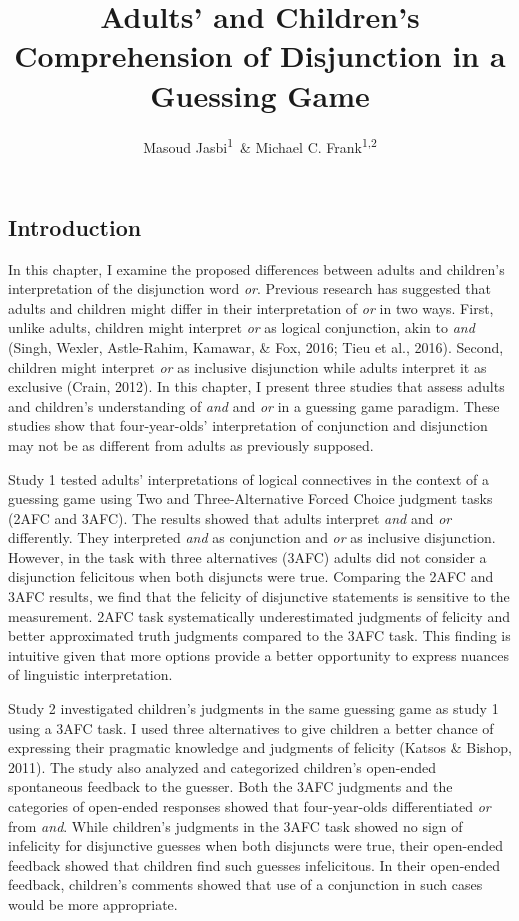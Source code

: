 \documentclass[man]{apa6}
\title{Adults' and Children's Comprehension of Disjunction in a Guessing Game}
\author{Masoud Jasbi\textsuperscript{1}~\& Michael C. Frank\textsuperscript{1,2}}
\affiliation{
    \vspace{0.5cm}
          \textsuperscript{1} Harvard University\\
          \textsuperscript{2} Stanford University  }
\theoremstyle{definition}
\theoremstyle{definition}
\theoremstyle{definition}
\theoremstyle{remark}
\begin{document}
\maketitle

\setcounter{secnumdepth}{0}



\subsection{Introduction}\label{introduction}

In this chapter, I examine the proposed differences between adults and
children's interpretation of the disjunction word \emph{or}. Previous
research has suggested that adults and children might differ in their
interpretation of \emph{or} in two ways. First, unlike adults, children
might interpret \emph{or} as logical conjunction, akin to \emph{and}
(Singh, Wexler, Astle-Rahim, Kamawar, \& Fox, 2016; Tieu et al., 2016).
Second, children might interpret \emph{or} as inclusive disjunction
while adults interpret it as exclusive (Crain, 2012). In this chapter, I
present three studies that assess adults and children's understanding of
\emph{and} and \emph{or} in a guessing game paradigm. These studies show
that four-year-olds' interpretation of conjunction and disjunction may
not be as different from adults as previously supposed.

Study 1 tested adults' interpretations of logical connectives in the
context of a guessing game using Two and Three-Alternative Forced Choice
judgment tasks (2AFC and 3AFC). The results showed that adults interpret
\emph{and} and \emph{or} differently. They interpreted \emph{and} as
conjunction and \emph{or} as inclusive disjunction. However, in the task
with three alternatives (3AFC) adults did not consider a disjunction
felicitous when both disjuncts were true. Comparing the 2AFC and 3AFC
results, we find that the felicity of disjunctive statements is
sensitive to the measurement. 2AFC task systematically underestimated
judgments of felicity and better approximated truth judgments compared
to the 3AFC task. This finding is intuitive given that more options
provide a better opportunity to express nuances of linguistic
interpretation.

Study 2 investigated children's judgments in the same guessing game as
study 1 using a 3AFC task. I used three alternatives to give children a
better chance of expressing their pragmatic knowledge and judgments of
felicity (Katsos \& Bishop, 2011). The study also analyzed and
categorized children's open-ended spontaneous feedback to the guesser.
Both the 3AFC judgments and the categories of open-ended responses
showed that four-year-olds differentiated \emph{or} from \emph{and}.
While children's judgments in the 3AFC task showed no sign of infelicity
for disjunctive guesses when both disjuncts were true, their open-ended
feedback showed that children find such guesses infelicitous. In their
open-ended feedback, children's comments showed that use of a
conjunction in such cases would be more appropriate.
\end{document}
